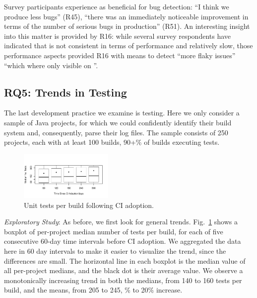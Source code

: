 Survey participants experience \Tvi as beneficial for bug detection: ``I think we produce less bugs'' (R45), ``there was an immediately noticeable improvement in terms of the number of serious bugs in production'' (R51). 
An interesting insight into this matter is provided by R16: while several survey respondents have indicated that \Tvis is not consistent in terms of performance and relatively slow, those performance aspects provided R16 with means to detect ``more flaky issues'' ``which where only visible on \Tvi''. 

\subsection{RQ5: Trends in Testing}

The last development practice we examine is testing.
Here we only consider a sample of Java projects, for which we could confidently
identify their build system and, consequently, parse their \Tvi log files. 
The sample consists of 250 projects, each with at least 100 builds, 90+\% of 
builds executing tests.

\begin{figure}[!t]
\centering
\includegraphics[width=0.4\textwidth, clip=true, trim=0 15 15 50]{tests.pdf}
\caption{Unit tests per build following CI adoption.}\vspace{-0.3cm}
\label{Fig:Tests}
\end{figure}

\smallskip\noindent \emph{Exploratory Study}: 
As before, we first look for general trends.
Fig.~\ref{Fig:Tests} shows a boxplot of per-project median number of tests 
per build, for each of five consecutive 60-day time intervals before CI adoption.
We aggregated the data here in 60 day intervals to make it easier to visualize 
the trend, since the differences are small.
The horizontal line in each boxplot is the median value of all per-project medians, 
and the black dot is their average value.
We observe a monotonically increasing trend in both the medians, from 140 to 
160 tests per build, and the means, from 205 to 245, \% to 20\% increase. 

